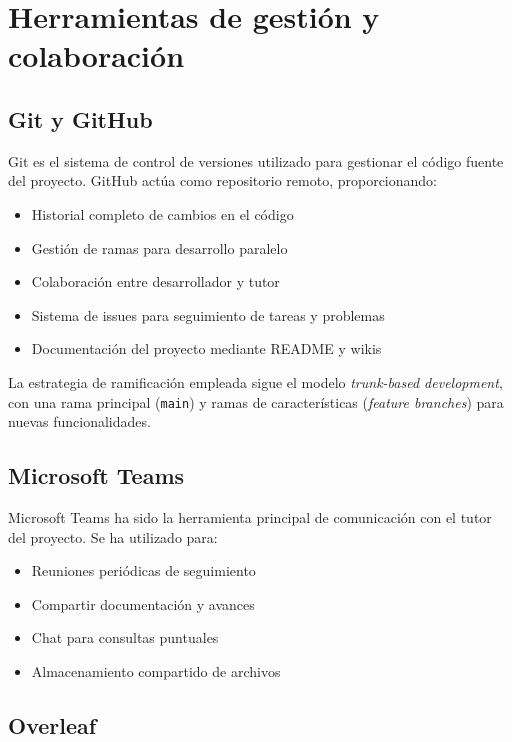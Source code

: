 \section{Herramientas de gestión y colaboración}\label{sec:herramientas-gestion}

\subsection{Git y GitHub}

Git es el sistema de control de versiones utilizado para gestionar el código fuente del proyecto. GitHub actúa como repositorio remoto, proporcionando:

\begin{itemize}
    \item Historial completo de cambios en el código
    \item Gestión de ramas para desarrollo paralelo
    \item Colaboración entre desarrollador y tutor
    \item Sistema de issues para seguimiento de tareas y problemas
    \item Documentación del proyecto mediante README y wikis
\end{itemize}

La estrategia de ramificación empleada sigue el modelo \textit{trunk-based development}, con una rama principal (\texttt{main}) y ramas de características (\textit{feature branches}) para nuevas funcionalidades.

\subsection{Microsoft Teams}

Microsoft Teams ha sido la herramienta principal de comunicación con el tutor del proyecto. Se ha utilizado para:

\begin{itemize}
    \item Reuniones periódicas de seguimiento
    \item Compartir documentación y avances
    \item Chat para consultas puntuales
    \item Almacenamiento compartido de archivos
\end{itemize}

\subsection{Overleaf}

